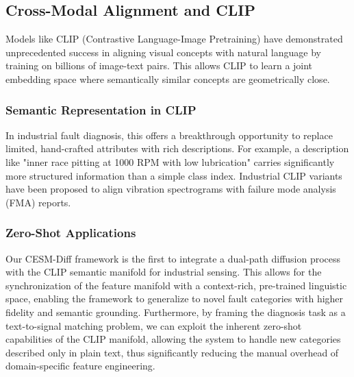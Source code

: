 \subsection{Cross-Modal Alignment and CLIP}
Models like CLIP (Contrastive Language-Image Pretraining) have demonstrated unprecedented success in aligning visual concepts with natural language by training on billions of image-text pairs. This allows CLIP to learn a joint embedding space where semantically similar concepts are geometrically close.

\subsubsection{Semantic Representation in CLIP}
In industrial fault diagnosis, this offers a breakthrough opportunity to replace limited, hand-crafted attributes with rich descriptions. For example, a description like "inner race pitting at 1000 RPM with low lubrication" carries significantly more structured information than a simple class index. Industrial CLIP variants have been proposed to align vibration spectrograms with failure mode analysis (FMA) reports.

\subsubsection{Zero-Shot Applications}
Our CESM-Diff framework is the first to integrate a dual-path diffusion process with the CLIP semantic manifold for industrial sensing. This allows for the synchronization of the feature manifold with a context-rich, pre-trained linguistic space, enabling the framework to generalize to novel fault categories with higher fidelity and semantic grounding. Furthermore, by framing the diagnosis task as a text-to-signal matching problem, we can exploit the inherent zero-shot capabilities of the CLIP manifold, allowing the system to handle new categories described only in plain text, thus significantly reducing the manual overhead of domain-specific feature engineering.
